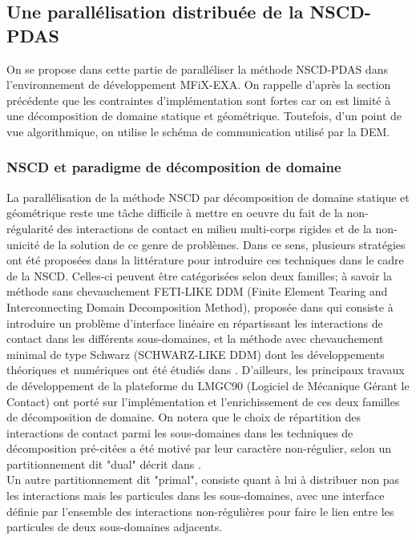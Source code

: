 \subsection{Une parallélisation distribuée de la NSCD-PDAS }

On se propose dans cette partie de paralléliser la méthode NSCD-PDAS dans l'environnement de développement MFiX-EXA. On rappelle d'après la section précédente que les contraintes d'implémentation sont fortes car on est limité à une décomposition de domaine statique et géométrique. Toutefois, d'un point de vue algorithmique, on utilise le schéma de communication utilisé par la DEM.

\subsubsection{NSCD et paradigme de décomposition de domaine}

La parallélisation de la méthode NSCD par décomposition de domaine statique et géométrique reste une tâche difficile à mettre en oeuvre du fait de la non-régularité des interactions de contact en milieu multi-corps rigides et de la non-unicité de la solution de ce genre de problèmes. Dans ce sens, plusieurs stratégies ont été proposées dans la littérature pour introduire ces techniques dans le cadre de la NSCD. Celles-ci peuvent être catégorisées selon deux familles; à savoir la méthode sans chevauchement FETI-LIKE DDM (Finite Element Tearing and Interconnecting Domain Decomposition Method), proposée dans \cite{alart2012nonlinear} qui consiste à introduire un problème d'interface linéaire en répartissant les interactions de contact dans les différents sous-domaines, et la méthode avec chevauchement minimal de type Schwarz (SCHWARZ-LIKE DDM) dont les développements théoriques et numériques 
ont été étudiés dans \cite{visseq2013high}. D'ailleurs, les principaux travaux de développement de la plateforme du LMGC90 (Logiciel de Mécanique Gérant le Contact) ont porté sur l'implémentation et l'enrichissement de ces deux familles de décomposition de domaine. On notera que le choix de répartition des interactions de contact parmi les sous-domaines dans les techniques de décomposition pré-citées a été motivé par leur caractère non-régulier, selon un partitionnement dit "dual" décrit dans \cite{visseq2013high}.\\
Un autre partitionnement dit "primal", consiste quant à lui à distribuer non pas les interactions mais les particules dans les sous-domaines, avec une interface définie par l'ensemble des interactions non-régulières pour faire le lien entre les particules de deux sous-domaines adjacents.


